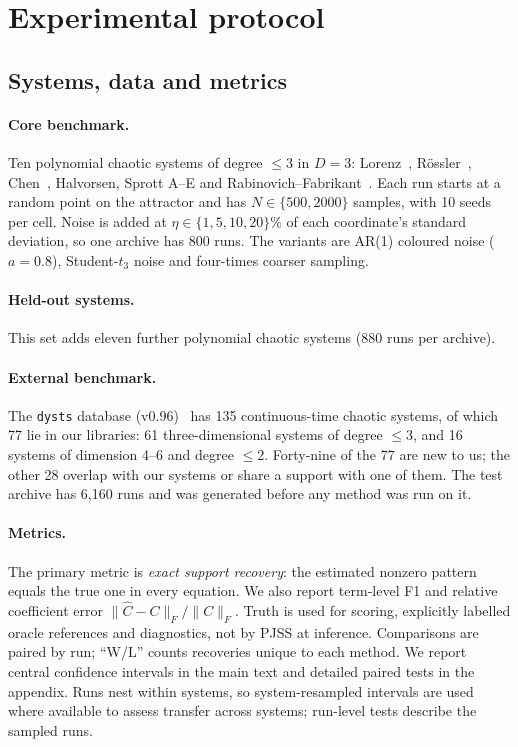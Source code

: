 \section{Experimental protocol}
\label{sec:protocol}

\subsection{Systems, data and metrics}
\paragraph{Core benchmark.} Ten polynomial chaotic systems of degree $\le3$ in $D=3$: Lorenz~\citep{lorenz1963}, R\"ossler~\citep{rossler1976}, Chen~\citep{chen1999}, Halvorsen, Sprott A--E and Rabinovich--Fabrikant~\citep{rabinovich1979}. Each run starts at a random point on the attractor and has $N\in\{500,2000\}$ samples, with 10 seeds per cell. Noise is added at $\eta\in\{1,5,10,20\}\%$ of each coordinate's standard deviation, so one archive has 800 runs. The variants are AR(1) coloured noise ($a=0.8$), Student-$t_3$ noise and four-times coarser sampling.

\paragraph{Held-out systems.} This set adds eleven further polynomial chaotic systems (880 runs per archive).

\paragraph{External benchmark.} The \texttt{dysts} database (v0.96)~\citep{gilpin2021dysts} has 135 continuous-time chaotic systems, of which 77 lie in our libraries: 61 three-dimensional systems of degree $\le3$, and 16 systems of dimension 4--6 and degree $\le 2$. Forty-nine of the 77 are new to us; the other 28 overlap with our systems or share a support with one of them. The test archive has 6{,}160 runs and was generated before any method was run on it.

\paragraph{Metrics.} The primary metric is \emph{exact support recovery}: the estimated nonzero pattern equals the true one in every equation. We also report term-level F1 and relative coefficient error $\lVert\hat C-C\rVert_F/\lVert C\rVert_F$. Truth is used for scoring, explicitly labelled oracle references and diagnostics, not by PJSS at inference. Comparisons are paired by run; ``W/L'' counts recoveries unique to each method. We report central confidence intervals in the main text and detailed paired tests in the appendix. Runs nest within systems, so system-resampled intervals are used where available to assess transfer across systems; run-level tests describe the sampled runs.

